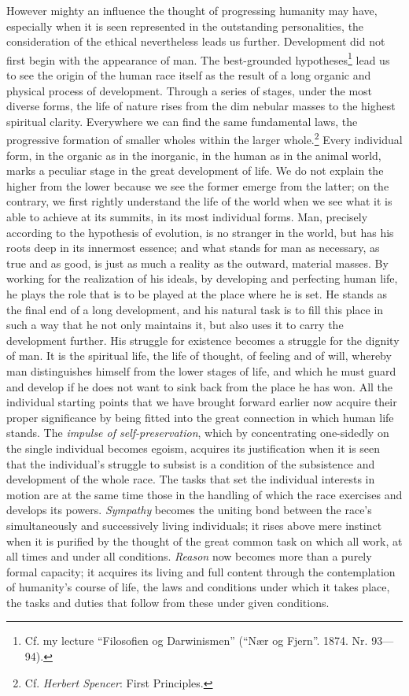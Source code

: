 \documentclass[12pt,a4paper,openany]{book}
\newcommand{\opage}[1]{\marginnote{\footnotesize\textit{[#1]}}}
\begin{document}
However mighty an influence the thought of progressing humanity may have,
especially when it is seen represented in the outstanding personalities, the
consideration of the ethical nevertheless leads us further. Development did
not first begin with the appearance of man. The best-grounded
\opage{83}hypotheses\footnote[1]{Cf. my lecture ``Filosofien og Darwinismen''
(``Nær og Fjern''. 1874. Nr. 93---94).} lead us to see the origin of the human
race itself as the result of a long organic and physical process of
development. Through a series of stages, under the most diverse forms, the
life of nature rises from the dim nebular masses to the highest spiritual
clarity. Everywhere we can find the same fundamental laws, the progressive
formation of smaller wholes within the larger whole.\footnote[2]{Cf.
\emph{Herbert Spencer}: First Principles.} Every individual form, in the
organic as in the inorganic, in the human as in the animal world, marks a
peculiar stage in the great development of life. We do not explain the higher
from the lower because we see the former emerge from the latter; on the
contrary, we first rightly understand the life of the world when we see what
it is able to achieve at its summits, in its most individual forms. Man,
precisely according to the hypothesis of evolution, is no stranger in the
world, but has his roots deep in its innermost essence; and what stands for
man as necessary, as true and as good, is just as much a reality as the
outward, material masses. By working for the realization of his ideals, by
developing and perfecting human life, he plays the role that is to be played
at the place where he is set. He stands as the final end of a long
development, and his natural task is to fill this place in such a way that he
not only maintains \opage{84}it, but also uses it to carry the development
further. His struggle for existence becomes a struggle for the dignity of man.
It is the spiritual life, the life of thought, of feeling and of will, whereby
man distinguishes himself from the lower stages of life, and which he must
guard and develop if he does not want to sink back from the place he has won.
All the individual starting points that we have brought forward earlier now
acquire their proper significance by being fitted into the great connection in
which human life stands. The \emph{impulse of self-preservation}, which by
concentrating one-sidedly on the single individual becomes egoism, acquires
its justification when it is seen that the individual's struggle to subsist is
a condition of the subsistence and development of the whole race. The tasks
that set the individual interests in motion are at the same time those in the
handling of which the race exercises and develops its powers. \emph{Sympathy}
becomes the uniting bond between the race's simultaneously and successively
living individuals; it rises above mere instinct when it is purified by the
thought of the great common task on which all work, at all times and under all
conditions. \emph{Reason} now becomes more than a purely formal capacity; it
acquires its living and full content through the contemplation of humanity's
course of life, the laws and conditions under which it takes place, the tasks
and duties that follow from these under given conditions.
\end{document}
